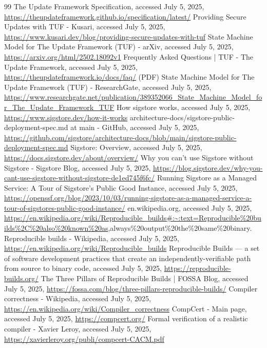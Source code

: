 \documentclass{article}
\begin{document}
\begin{thebibliography}{99}
The Update Framework Specification, accessed July 5, 2025, \url{https://theupdateframework.github.io/specification/latest/}
Providing Secure Updates with TUF - Kusari, accessed July 5, 2025, \url{https://www.kusari.dev/blog/providing-secure-updates-with-tuf}
State Machine Model for The Update Framework (TUF) - arXiv, accessed July 5, 2025, \url{https://arxiv.org/html/2502.18092v1}
Frequently Asked Questions | TUF - The Update Framework, accessed July 5, 2025, \url{https://theupdateframework.io/docs/faq/}
(PDF) State Machine Model for The Update Framework (TUF) - ResearchGate, accessed July 5, 2025, \url{https://www.researchgate.net/publication/389352066\_State\_Machine\_Model\_for\_The\_Update\_Framework\_TUF}
How sigstore works, accessed July 5, 2025, \url{https://www.sigstore.dev/how-it-works}
architecture-docs/sigstore-public-deployment-spec.md at main - GitHub, accessed July 5, 2025, \url{https://github.com/sigstore/architecture-docs/blob/main/sigstore-public-deployment-spec.md}
Sigstore: Overview, accessed July 5, 2025, \url{https://docs.sigstore.dev/about/overview/}
Why you can't use Sigstore without Sigstore - Sigstore Blog, accessed July 5, 2025, \url{https://blog.sigstore.dev/why-you-cant-use-sigstore-without-sigstore-de1ed745f6fc/}
Running Sigstore as a Managed Service: A Tour of Sigstore's Public Good Instance, accessed July 5, 2025, \url{https://openssf.org/blog/2023/10/03/running-sigstore-as-a-managed-service-a-tour-of-sigstores-public-good-instance/}
en.wikipedia.org, accessed July 5, 2025, \url{https://en.wikipedia.org/wiki/Reproducible\_builds\#:~:text=Reproducible\%20builds\%2C\%20also\%20known\%20as},always\%20output\%20the\%20same\%20binary.
Reproducible builds - Wikipedia, accessed July 5, 2025, \url{https://en.wikipedia.org/wiki/Reproducible\_builds}
Reproducible Builds --- a set of software development practices that create an independently-verifiable path from source to binary code, accessed July 5, 2025, \url{https://reproducible-builds.org/}
The Three Pillars of Reproducible Builds | FOSSA Blog, accessed July 5, 2025, \url{https://fossa.com/blog/three-pillars-reproducible-builds/}
Compiler correctness - Wikipedia, accessed July 5, 2025, \url{https://en.wikipedia.org/wiki/Compiler\_correctness}
CompCert - Main page, accessed July 5, 2025, \url{https://compcert.org/}
Formal verification of a realistic compiler - Xavier Leroy, accessed July 5, 2025, \url{https://xavierleroy.org/publi/compcert-CACM.pdf}

\end{thebibliography}
\end{document}
